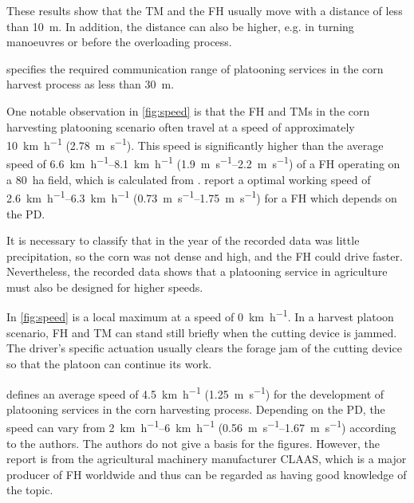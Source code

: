 These results show that the \ac{TM} and the \ac{FH} usually move with a distance of less than \SI{10}{\metre}.
In addition, the distance can also be higher, e.g. in turning manoeuvres or before the overloading process.

\textcite{smolnik_5g_2020} specifies the required communication range of platooning services in the corn harvest process
as less than \SI{30}{\metre}.

One notable observation in \autoref{fig:speed} is that the \ac{FH} and \acp{TM} in the corn harvesting platooning scenario
often travel at a speed of approximately \SI{10}{\kilo\metre\per\hour} (\SI{2.78}{\metre\per\second}).
This speed is significantly higher than the average speed of \SIrange{6.6}{8.1}{\kilo\metre\per\hour} (\SIrange{1.9}{2.2}{\metre\per\second}) of a \ac{FH} operating on a \SI{80}{\hectare} field, which is calculated from \cite{faustzahlen2018}.
\textcite{nedelcu_influence_2020} report a optimal working speed of \SIrange{2.6}{6.3}{\kilo\metre\per\hour} (\SIrange{0.73}{1.75}{\metre\per\second}) for a \ac{FH} which depends on the \ac{PD}.


It is necessary to classify that in the year of the recorded data was little precipitation, so the corn was not dense and high,
and the \ac{FH} could drive faster.
Nevertheless, the recorded data shows that a platooning service in agriculture must also be designed for higher speeds.

In \autoref{fig:speed} is a local maximum at a speed of \SI{0}{\kilo\metre\per\hour}.
In a harvest platoon scenario, \ac{FH} and \ac{TM} can stand still briefly when the cutting device is jammed.
The driver's specific actuation usually clears the forage jam of the cutting device so that the platoon can continue its work.

\textcite{smolnik_5g_2020} defines an average speed of \SI{4.5}{\kilo\metre\per\hour} (\SI{1.25}{\metre\per\second}) for the development of platooning
services in the corn harvesting process.
Depending on the \ac{PD}, the speed can vary from \SIrange{2}{6}{\kilo\metre\per\hour} (\SIrange{0.56}{1.67}{\metre\per\second}) according to the authors.
The authors do not give a basis for the figures.
However, the report is from the agricultural machinery manufacturer CLAAS,
which is a major producer of \ac{FH} worldwide and thus can be regarded as having good knowledge of the topic.

